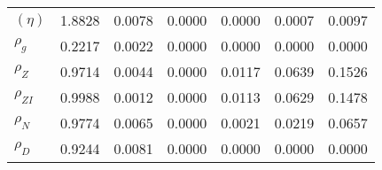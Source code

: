 \begin{center}
\begin{longtable}{lcccccc}
$ (\eta)              $	 & 	          1.8828	 & 	          0.0078	 & 	          0.0000	 & 	          0.0000	 & 	          0.0007	 & 	          0.0097 \\ 
$ {\rho_g}            $	 & 	          0.2217	 & 	          0.0022	 & 	          0.0000	 & 	          0.0000	 & 	          0.0000	 & 	          0.0000 \\ 
$ {\rho_Z}            $	 & 	          0.9714	 & 	          0.0044	 & 	          0.0000	 & 	          0.0117	 & 	          0.0639	 & 	          0.1526 \\ 
$ {\rho_{ZI}}         $	 & 	          0.9988	 & 	          0.0012	 & 	          0.0000	 & 	          0.0113	 & 	          0.0629	 & 	          0.1478 \\ 
$ {\rho_N}            $	 & 	          0.9774	 & 	          0.0065	 & 	          0.0000	 & 	          0.0021	 & 	          0.0219	 & 	          0.0657 \\ 
$ {\rho_D}            $	 & 	          0.9244	 & 	          0.0081	 & 	          0.0000	 & 	          0.0000	 & 	          0.0000	 & 	          0.0000 \\ 
\end{longtable}
 \end{center}
